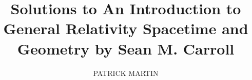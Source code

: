 \documentclass{uicthesi_modified}
\begin{document}
\title{Solutions to An Introduction to General Relativity Spacetime and Geometry by Sean M. Carroll}

\author{PATRICK MARTIN}


\degree{}

\committee{}

\maketitle
\copyrightpage



\bibformb

\end{document}
